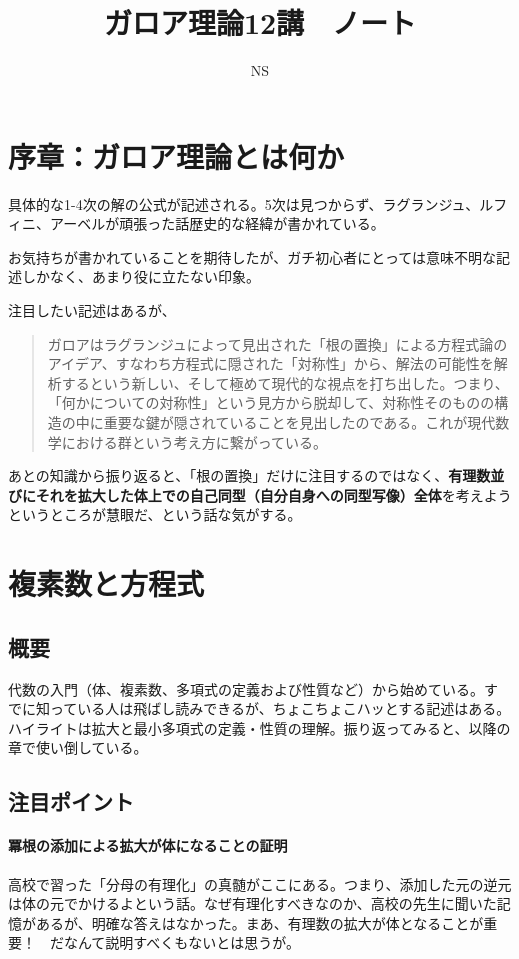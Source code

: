 \documentclass{jsarticle}
\title{ガロア理論12講　ノート}
\author{NS}
\begin{document}
\maketitle

\section*{序章：ガロア理論とは何か}

具体的な1-4次の解の公式が記述される。5次は見つからず、ラグランジュ、ルフィニ、アーベルが頑張った話歴史的な経緯が書かれている。

お気持ちが書かれていることを期待したが、ガチ初心者にとっては意味不明な記述しかなく、あまり役に立たない印象。

注目したい記述はあるが、
\begin{quotation}
    ガロアはラグランジュによって見出された「根の置換」による方程式論のアイデア、すなわち方程式に隠された「対称性」から、解法の可能性を解析するという新しい、そして極めて現代的な視点を打ち出した。つまり、「何かについての対称性」という見方から脱却して、対称性そのものの構造の中に重要な鍵が隠されていることを見出したのである。これが現代数学における群という考え方に繋がっている。
\end{quotation}

あとの知識から振り返ると、「根の置換」だけに注目するのではなく、\textbf{有理数並びにそれを拡大した体上での自己同型（自分自身への同型写像）全体}を考えようというところが慧眼だ、という話な気がする。 

\section{複素数と方程式}

\subsection{概要}
代数の入門（体、複素数、多項式の定義および性質など）から始めている。すでに知っている人は飛ばし読みできるが、ちょこちょこハッとする記述はある。
ハイライトは拡大と最小多項式の定義・性質の理解。振り返ってみると、以降の章で使い倒している。

\subsection{注目ポイント}

\paragraph*{冪根の添加による拡大が体になることの証明} 高校で習った「分母の有理化」の真髄がここにある。つまり、添加した元の逆元は体の元でかけるよという話。なぜ有理化すべきなのか、高校の先生に聞いた記憶があるが、明確な答えはなかった。まあ、有理数の拡大が体となることが重要！　だなんて説明すべくもないとは思うが。
\end{document}
